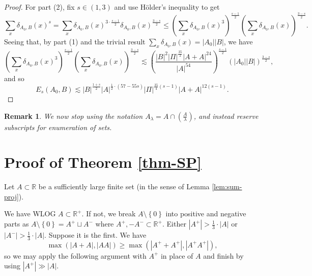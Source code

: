 \documentclass[reqno]{amsart}
\newcommand{\holder}{H\"older}
\numberwithin{equation}{section}
\newtheorem{remark}[theorem]{Remark}
\begin{document}
\begin{proof}
For part (2), fix \(s \in (1,3)\) and use \holder's inequality to get
\[
    \sum _{x} \delta_{A_0,B} (x)^{s} = \sum _{x} \delta_{A_0,B} (x) ^{3 \cdot \frac{s-1}{2}  } \delta_{A_0,B} (x) ^{\frac{3- s }{2} } \leq \left( \sum _{x} \delta_{A_0,B} (x)^{3}  \right) ^{\frac{s-1}{2} } \left( \sum _{x} \delta_{A_0,B} (x) \right) ^{\frac{3-s}{2} }
.\]
Seeing that, by part (1) and the trivial result \( \sum _{x} \delta_{A_0,B} (x) = \left\lvert A_0 \right\rvert \left\lvert B \right\rvert \),
we have
\[
    \left( \sum _{x} \delta_{A_0,B} (x)^{3}  \right) ^{\frac{s-1}{2} } \left( \sum _{x} \delta_{A_0,B} (x) \right) ^{\frac{3-s}{2} } \lesssim \left( \frac{\left\lvert B \right\rvert^{2}  \left\lvert \Pi \right\rvert ^{\frac{35}{2} } \left\lvert A+A \right\rvert ^{24}}{\left\lvert A \right\rvert ^{54}}  \right) ^{\frac{s-1}{2} }\left( \left\lvert A_0 \right\rvert \left\lvert B \right\rvert  \right) ^{\frac{3-s}{2} }
,\]
and so
\[
    E_{s} (A_0,B) \lesssim \left\lvert B \right\rvert ^{\frac{1 + s}{2} } \left\lvert A \right\rvert ^{\frac{1}{2} \cdot \left( 57 - 55s \right) } \left\lvert \Pi \right\rvert ^{\frac{35}{4} (s-1)} \left\lvert A+A \right\rvert ^{12 \left( s-1 \right) }
.\]

\end{proof}

\begin{remark}
We now stop using the notation \(A_{\lambda} = A \cap \left(  \frac{A}{\lambda}  \right) \), and instead
reserve subscripts for enumeration of sets.
\end{remark}

\bigskip

\section{Proof of Theorem \ref{thm-SP}}\label{section:SP}

Let \(A \subset \mathbb{R} \) be a sufficiently large finite set (in the sense of Lemma \ref{lem:sum-proj}).

We have WLOG \(A \subset \mathbb{R} ^{+}\). If not, we break \(A\setminus \left\{ 0 \right\} \) into positive and negative parts
as \(A \setminus \left\{ 0 \right\} = A^{+} \sqcup A^{-} \) where \(A^{+} , -A^{-} \subset \mathbb{R} ^{+}\). Either \(\left\lvert A^{+} \right\rvert  > \frac{1}{3} \cdot  \left\lvert A \right\rvert \) or \(\left\lvert A ^{-}\right\rvert  > \frac{1}{3} \cdot \left\lvert A \right\rvert  \).
Suppose it is the first.
We have
\[
    \max \left( \left\lvert A+A \right\rvert , \left\lvert AA \right\rvert  \right) \geq \max \left( \left\lvert A^{+ } + A^{+ } \right\rvert , \left\lvert A^{+ }A^{+ } \right\rvert  \right) 
,\]
so we may apply the following argument with \(A^{+}\) in place of \(A\) and finish by using \(\left\lvert A^{+} \right\rvert \gg \left\lvert A \right\rvert \).
\end{document}
